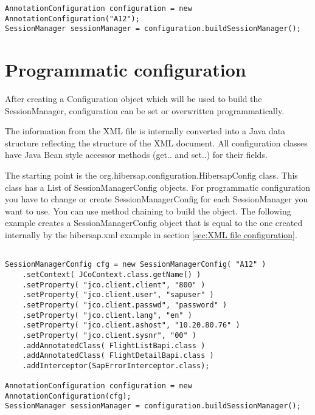 \begin{Verbatim}[frame=single,label=hibersap.xml]
AnnotationConfiguration configuration = new AnnotationConfiguration("A12");
SessionManager sessionManager = configuration.buildSessionManager();
\end{Verbatim}


\section{Programmatic configuration}
\label{sec:Programmatic configuration}

After creating a Configuration object which will be used to build the SessionManager, configuration can be set or
overwritten programmatically.

The information from the XML file is internally converted into a Java data structure reflecting the structure of the
XML document. All configuration classes have Java Bean style accessor methods (get.. and set..) for
their fields. 

The starting point is the org.hibersap.configuration.HibersapConfig class. This class has a List of
SessionManagerConfig objects. For programmatic configuration you have to change or create SessionManagerConfig for each 
SessionManager you want to use. You can use method chaining to build the
object. The following example creates a  SessionManagerConfig object that is equal to the one created internally by the
hibersap.xml example in section \ref{sec:XML file configuration}. 

\begin{Verbatim}[frame=single,label=Programmatic configuration]

SessionManagerConfig cfg = new SessionManagerConfig( "A12" )
    .setContext( JCoContext.class.getName() )
    .setProperty( "jco.client.client", "800" )
    .setProperty( "jco.client.user", "sapuser" )
    .setProperty( "jco.client.passwd", "password" )
    .setProperty( "jco.client.lang", "en" )
    .setProperty( "jco.client.ashost", "10.20.80.76" )
    .setProperty( "jco.client.sysnr", "00" )
    .addAnnotatedClass( FlightListBapi.class )
    .addAnnotatedClass( FlightDetailBapi.class )
    .addInterceptor(SapErrorInterceptor.class);

AnnotationConfiguration configuration = new AnnotationConfiguration(cfg);
SessionManager sessionManager = configuration.buildSessionManager();

\end{Verbatim}









